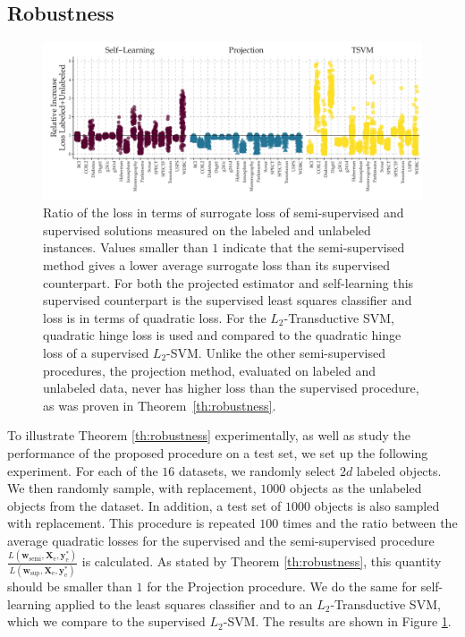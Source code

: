 \documentclass[smallcondensed]{svjour3}\usepackage[]{graphicx}\usepackage[]{color}
\makeatletter
\def\maxwidth{ %
  \ifdim\Gin@nat@width>\linewidth
    \linewidth
  \else
    \Gin@nat@width
  \fi
}
\newenvironment{knitrout}{}{} %
\newcommand{\Xe}{\vec{X}_\mathrm{e}  }
\renewcommand{\vec}[1]{\mathbf{#1}}
\makeatother
\begin{document}
\subsection{Robustness}
\begin{knitrout}
\color{fgcolor}\begin{figure}
\includegraphics[width=\maxwidth]{lossdifference-1} \caption{Ratio of the loss in terms of surrogate loss of semi-supervised and supervised solutions measured on the labeled and unlabeled instances. Values smaller than $1$ indicate that the semi-supervised method gives a lower average surrogate loss than its supervised counterpart. For both the projected estimator and self-learning this supervised counterpart is the supervised least squares classifier and loss is in terms of quadratic loss. For the $L_2$-Transductive SVM, quadratic hinge loss is used and compared to the quadratic hinge loss of a supervised $L_2$-SVM. Unlike the other semi-supervised procedures, the projection method, evaluated on labeled and unlabeled data, never has higher loss than the supervised procedure, as was proven in Theorem~\ref{th:robustness}.}\label{fig:lossdifference}
\end{figure}


\end{knitrout}

To illustrate Theorem \ref{th:robustness} experimentally, as well as study the performance of the proposed procedure on a test set, we set up the following experiment. For each of the $16$ datasets, we randomly select $2 d$ labeled objects. We then randomly sample, with replacement, $1000$ objects as the unlabeled objects from the dataset. In addition, a test set of $1000$ objects is also sampled with replacement. This procedure is repeated $100$ times and the ratio between the average quadratic losses for the supervised and the semi-supervised procedure $\tfrac{L(\vec{w}_\text{semi},\Xe,\vec{y}_\text{e}^{\ast})}{L(\vec{w}_\text{sup},\Xe,\vec{y}_\text{e}^{\ast})}$ is calculated. As stated by Theorem \ref{th:robustness}, this quantity should be smaller than $1$ for the Projection procedure. We do the same for self-learning applied to the least squares classifier and to an $L_2$-Transductive SVM, which we compare to the supervised $L_2$-SVM. The results are shown in Figure \ref{fig:lossdifference}. 
\end{document}
